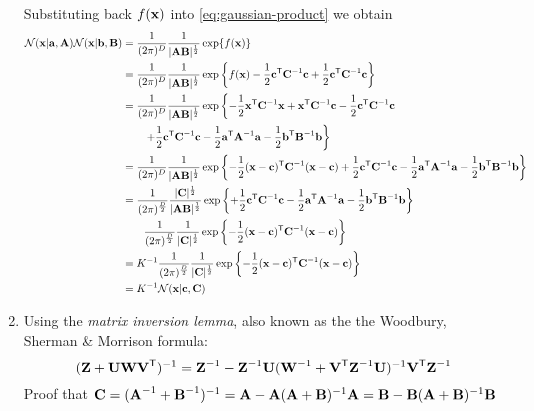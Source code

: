 \documentclass{amsmlaj}
\begin{document}
\begin{problem}
\begin{enumerate}
	Substituting back $f(\bm{\mathbf{x}})$ into \eqref{eq:gaussian-product} we obtain
	\begin{equation} 
		\begin{split}
			\mathcal{N}(\bm{\mathbf{x}}|\bm{\mathbf{a}},\bm{\mathbf{A}})\mathcal{N}(\bm{\mathbf{x}}|\bm{\mathbf{b}},\bm{\mathbf{B}})
			&=\frac{1}{(2\pi)^D}\frac{1}{|\bm{\mathbf{AB}}|^{\frac{1}{2}}}\exp\{f(\bm{\mathbf{x}})\} \\
			&=\frac{1}{(2\pi)^D}\frac{1}{|\bm{\mathbf{AB}}|^{\frac{1}{2}}}\exp\left\{
							f(\bm{\mathbf{x}})-\frac{1}{2}\bm{\mathbf{c}}^{\mathsf{T}}\bm{\mathbf{C}}^{-1}\bm{\mathbf{c}}
							+\frac{1}{2}\bm{\mathbf{c}}^{\mathsf{T}}\bm{\mathbf{C}}^{-1}\bm{\mathbf{c}}
			\right\} \\
			&=\frac{1}{(2\pi)^D}\frac{1}{|\bm{\mathbf{AB}}|^{\frac{1}{2}}}\exp\left\{
							-\frac{1}{2}\bm{\mathbf{x}}^{\mathsf{T}}\bm{\mathbf{C}}^{-1}\bm{\mathbf{x}}
							+\bm{\mathbf{x}}^{\mathsf{T}}\bm{\mathbf{C}}^{-1}\bm{\mathbf{c}}
							-\frac{1}{2}\bm{\mathbf{c}}^{\mathsf{T}}\bm{\mathbf{C}}^{-1}\bm{\mathbf{c}} \right.\nonumber \\
							&\qquad \left.+\frac{1}{2}\bm{\mathbf{c}}^{\mathsf{T}}\bm{\mathbf{C}}^{-1}\bm{\mathbf{c}}
							-\frac{1}{2}\bm{\mathbf{a}}^{\mathsf{T}}\bm{\mathbf{A}}^{-1}\bm{\mathbf{a}}
							-\frac{1}{2}\bm{\mathbf{b}}^{\mathsf{T}}\bm{\mathbf{B}}^{-1}\bm{\mathbf{b}}
			\right\} \\
			&=\frac{1}{(2\pi)^D}\frac{1}{|\bm{\mathbf{AB}}|^{\frac{1}{2}}}\exp\left\{
							-\frac{1}{2}(\bm{\mathbf{x}}-\bm{\mathbf{c}})^{\mathsf{T}}\bm{\mathbf{C}}^{-1}(\bm{\mathbf{x}}-\bm{\mathbf{c}})
							+\frac{1}{2}\bm{\mathbf{c}}^{\mathsf{T}}\bm{\mathbf{C}}^{-1}\bm{\mathbf{c}}
							-\frac{1}{2}\bm{\mathbf{a}}^{\mathsf{T}}\bm{\mathbf{A}}^{-1}\bm{\mathbf{a}}
							-\frac{1}{2}\bm{\mathbf{b}}^{\mathsf{T}}\bm{\mathbf{B}}^{-1}\bm{\mathbf{b}}
			\right\} \\
			&=\frac{1}{(2\pi)^{\frac{D}{2}}}\frac{|\bm{\mathbf{C}}|^{\frac{1}{2}}}{|\bm{\mathbf{AB}}|^{\frac{1}{2}}}\exp\left\{
							+\frac{1}{2}\bm{\mathbf{c}}^{\mathsf{T}}\bm{\mathbf{C}}^{-1}\bm{\mathbf{c}}
							-\frac{1}{2}\bm{\mathbf{a}}^{\mathsf{T}}\bm{\mathbf{A}}^{-1}\bm{\mathbf{a}}
							-\frac{1}{2}\bm{\mathbf{b}}^{\mathsf{T}}\bm{\mathbf{B}}^{-1}\bm{\mathbf{b}}
			\right\} \\
			&\qquad \frac{1}{(2\pi)^{\frac{D}{2}}}\frac{1}{|\bm{\mathbf{C}}|^{\frac{1}{2}}}\exp\left\{
							-\frac{1}{2}(\bm{\mathbf{x}}-\bm{\mathbf{c}})^{\mathsf{T}}\bm{\mathbf{C}}^{-1}(\bm{\mathbf{x}}-\bm{\mathbf{c}})
			\right\} \\
			&=K^{-1}\frac{1}{(2\pi)^{\frac{D}{2}}}\frac{1}{|\bm{\mathbf{C}}|^{\frac{1}{2}}}\exp\left\{
							-\frac{1}{2}(\bm{\mathbf{x}}-\bm{\mathbf{c}})^{\mathsf{T}}\bm{\mathbf{C}}^{-1}(\bm{\mathbf{x}}-\bm{\mathbf{c}})
			\right\} \\
			&=K^{-1}\mathcal{N}(\bm{\mathbf{x}}|\bm{\mathbf{c}},\bm{\mathbf{C}})
		\end{split}
	\end{equation}

\item Using the \emph{matrix inversion lemma}, also known as the
				the Woodbury, Sherman \& Morrison formula: 
				\begin{equation}
					(\bm{\mathbf{Z}}+\bm{\mathbf{U}}\bm{\mathbf{W}}\bm{\mathbf{V}}^{\mathsf{T}})^{-1} =
					\bm{\mathbf{Z}}^{-1} -
					\bm{\mathbf{Z}}^{-1}\bm{\mathbf{U}}(\bm{\mathbf{W}}^{-1}+\bm{\mathbf{V}}^{\mathsf{T}}
					\bm{\mathbf{Z}}^{-1}\bm{\mathbf{U}})^{-1}\bm{\mathbf{V}}^{\mathsf{T}} \bm{\mathbf{Z}}^{-1}
				\end{equation}
				Proof that $\bm{\mathbf{C}} =
				(\bm{\mathbf{A}}^{-1}+\bm{\mathbf{B}}^{-1})^{-1}=\bm{\mathbf{A}} -
				\bm{\mathbf{A}}(\bm{\mathbf{A}}+\bm{\mathbf{B}})^{-1}\bm{\mathbf{A}} = \bm{\mathbf{B}} -
				\bm{\mathbf{B}}(\bm{\mathbf{A}}+\bm{\mathbf{B}})^{-1}\bm{\mathbf{B}}$


\end{enumerate}
\end{problem}
\end{document}
